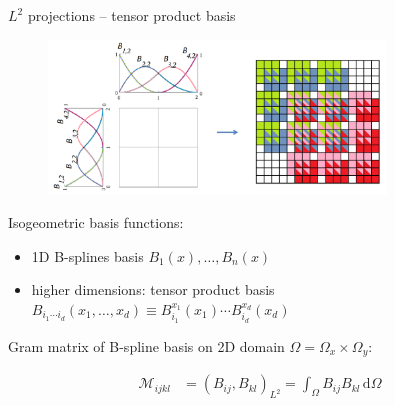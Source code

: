 \documentclass[c]{beamer}
\newcommand{\Prod}[2]{(#1, #2)_{L^2}}
\begin{document}
\begin{frame}{$L^2$ projections -- tensor product basis}

\begin{figure}
  \centering
  \includegraphics[width=0.8\textwidth]{img/2DFEM}
\end{figure}

Isogeometric basis functions:
\begin{itemize}
  \item 1D B-splines basis $B_1(x),\ldots, B_n(x)$
  \item higher dimensions: tensor product basis\\
        $B_{i_1\cdots i_d}(x_1,\ldots,x_d)
        \equiv B^{x_1}_{i_1}(x_1)\cdots B^{x_d}_{i_d}(x_d)$ \\
\end{itemize}
Gram matrix of B-spline basis on 2D domain $\Omega = \Omega_x \times \Omega_y$:

\begin{equation*}
  \begin{aligned}
  \mathcal{M}_{ijkl} &=
  \Prod{B_{ij}}{B_{kl}} =
  \int_\Omega B_{ij}B_{kl}\,\mbox{d}\Omega 
  \end{aligned}
\end{equation*}

\end{frame}

\end{document}

